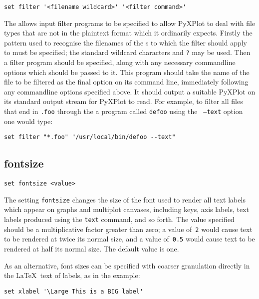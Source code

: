 \begin{verbatim}
set filter '<filename wildcard>' '<filter command>'
\end{verbatim}

The  allows input filter programs to be specified to allow
PyXPlot to deal with file types that are not in the plaintext format which it
ordinarily expects.  Firstly the pattern used to recognise the filenames of the
\datafile s to which the filter should apply to must be specified; the standard
wildcard characters {\tt *} and {\tt ?} may be used.  Then a filter program
should be specified, along with any necessary commandline options which should
be passed to it.  This program should take the name of the file to be filtered
as the final option on its command line, immediately following any commandline
options specified above.  It should output a suitable PyXPlot \datafile on its
standard output stream for PyXPlot to read.  For example, to filter all files
that end in {\tt .foo} through the a program called {\tt defoo} using the {\tt
--text} option one would type:

\begin{verbatim}
set filter "*.foo" "/usr/local/bin/defoo --text"
\end{verbatim}

\subsection{fontsize}

\begin{verbatim}
set fontsize <value>
\end{verbatim}

The setting {\tt fontsize} changes the size of the font used to render all text
labels which appear on graphs and multiplot canvases, including keys, axis
labels, text labels produced using the {\tt text} command, and so forth. The
value specified should be a multiplicative factor greater than zero; a value
of~{\tt 2} would cause text to be rendered at twice its normal size, and a
value of~{\tt 0.5} would cause text to be rendered at half its normal size.
The default value is one.

As an alternative, font sizes can be specified with coarser granulation
directly in the \LaTeX\ text of labels, as in the example:

\begin{verbatim}
set xlabel '\Large This is a BIG label'
\end{verbatim}


